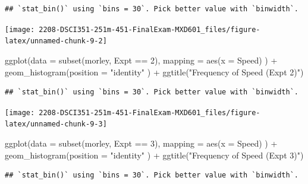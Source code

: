 \documentclass[
]{article}
\newenvironment{Shaded}{\begin{snugshade}}{\end{snugshade}}
\newcommand{\AttributeTok}[1]{\textcolor[rgb]{0.77,0.63,0.00}{#1}}
\newcommand{\DecValTok}[1]{\textcolor[rgb]{0.00,0.00,0.81}{#1}}
\newcommand{\FunctionTok}[1]{\textcolor[rgb]{0.00,0.00,0.00}{#1}}
\newcommand{\NormalTok}[1]{#1}
\newcommand{\SpecialCharTok}[1]{\textcolor[rgb]{0.00,0.00,0.00}{#1}}
\newcommand{\StringTok}[1]{\textcolor[rgb]{0.31,0.60,0.02}{#1}}
\begin{document}
\begin{verbatim}
## `stat_bin()` using `bins = 30`. Pick better value with `binwidth`.
\end{verbatim}

\begin{center}\texttt{[image: 2208-DSCI351-251m-451-FinalExam-MXD601\_files/figure-latex/unnamed-chunk-9-2]} \end{center}

\begin{Shaded}
\begin{Highlighting}[]
\FunctionTok{ggplot}\NormalTok{(}\AttributeTok{data =} \FunctionTok{subset}\NormalTok{(morley, Expt }\SpecialCharTok{==} \DecValTok{2}\NormalTok{),}
       \AttributeTok{mapping =} \FunctionTok{aes}\NormalTok{(}\AttributeTok{x =}\NormalTok{ Speed)}
\NormalTok{       ) }\SpecialCharTok{+} \FunctionTok{geom\_histogram}\NormalTok{(}\AttributeTok{position =} \StringTok{"identity"}
\NormalTok{       ) }\SpecialCharTok{+} \FunctionTok{ggtitle}\NormalTok{(}\StringTok{"Frequency of Speed (Expt 2)"}\NormalTok{)}
\end{Highlighting}
\end{Shaded}

\begin{verbatim}
## `stat_bin()` using `bins = 30`. Pick better value with `binwidth`.
\end{verbatim}

\begin{center}\texttt{[image: 2208-DSCI351-251m-451-FinalExam-MXD601\_files/figure-latex/unnamed-chunk-9-3]} \end{center}

\begin{Shaded}
\begin{Highlighting}[]
\FunctionTok{ggplot}\NormalTok{(}\AttributeTok{data =} \FunctionTok{subset}\NormalTok{(morley, Expt }\SpecialCharTok{==} \DecValTok{3}\NormalTok{),}
       \AttributeTok{mapping =} \FunctionTok{aes}\NormalTok{(}\AttributeTok{x =}\NormalTok{ Speed)}
\NormalTok{       ) }\SpecialCharTok{+} \FunctionTok{geom\_histogram}\NormalTok{(}\AttributeTok{position =} \StringTok{"identity"}
\NormalTok{       ) }\SpecialCharTok{+} \FunctionTok{ggtitle}\NormalTok{(}\StringTok{"Frequency of Speed (Expt 3)"}\NormalTok{)}
\end{Highlighting}
\end{Shaded}

\begin{verbatim}
## `stat_bin()` using `bins = 30`. Pick better value with `binwidth`.
\end{verbatim}
\end{document}
